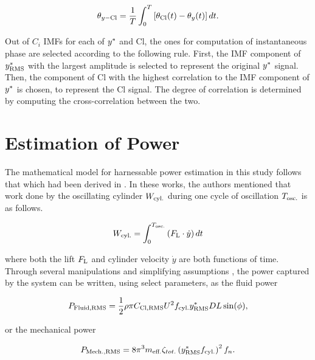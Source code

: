 \documentclass[oneside]{utmthesis}
\begin{document}

\begin{equation}
  \theta_{y-\text{Cl}} = \frac{1}{T} \int_{0}^{T} \left[ \theta_{\text{Cl}}(t) - \theta_{y}(t) \right] dt.
  \label{eq:phaseLagDefinition}
\end{equation}

Out of $C_{i}$ IMFs for each of $y^{*}$ and Cl, the ones for computation of instantaneous phase are selected according to the following rule. First, the IMF component of $y^{*}_{\text{RMS}}$ with the largest \rms{} amplitude is selected to represent the original $y^{*}$ signal. Then, the component of Cl with the highest correlation to the IMF component of $y^{*}$ is chosen, to represent the Cl signal. The degree of correlation is determined by computing the cross-correlation between the two.

\section{Estimation of Power} \label{sec:estimationOfPower}

The mathematical model for harnessable power estimation in this study follows that which had been derived in \citet{Raghavanetal2007}. In these works, the authors mentioned that work done by the oscillating cylinder $W_{\text{cyl.}}$ during one cycle of oscillation $T_{\text{osc.}}$ is as follows.

\begin{equation}
  W_{\text{cyl.}} = \int_{0}^{T_{\text{osc.}}} \left ( F_{\text{L}} \cdot \dot{y} \right ) dt
  \label{eq:workCylinder}
\end{equation}

\noindent where both the lift $F_{\text{L}}$ and cylinder velocity $\dot{y}$ are both functions of time. Through several manipulations and simplifying assumptions \citep{Sun2016}, the power captured by the system can be written, using select parameters, as the fluid power

\begin{equation}
  P_{\text{Fluid,RMS}} = \frac{1}{2} \rho \pi C_{\text{Cl},\text{RMS}} U^{2} f_{\text{cyl.}} y^{*}_{\text{RMS}} D L \sin(\phi),
  \label{eq:rmsFluidPower}
\end{equation}

\noindent or the mechanical power

\begin{equation}
  P_{\text{Mech.,RMS}} = 8 \pi^{3} m_{\text{eff.}} \zeta_{tot.} \left (y^{*}_{\text{RMS}} f_{\text{cyl.}} \right )^{2} f_{n}.
  \label{eq:rmsMechPower}
\end{equation}
\end{document}
